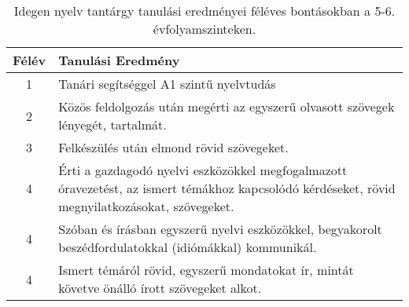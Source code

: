        
           \begin{longtable}{c | p{} }
            \caption[Idegen nyelv 5-6.]{Idegen nyelv tantárgy tanulási eredményei féléves bontásokban a 5-6. évfolyamszinteken. }  \\

            \textbf{Félév} & \textbf{Tanulási Eredmény} \\
            \hline
            \endhead
                                
                                          1 &  Tanári segítséggel A1 szintű nyelvtudás \\ \hline
                                          2 &  Közös feldolgozás után megérti az egyszerű olvasott szövegek lényegét, tartalmát. \\ \hline
                                          3 &  Felkészülés után elmond rövid szövegeket. \\ \hline
                                        
                                          4 &  Érti a gazdagodó nyelvi eszközökkel megfogalmazott óravezetést, az ismert témákhoz kapcsolódó kérdéseket, rövid megnyilatkozásokat, szövegeket. \\ \hline
                                          4 &  Szóban és írásban egyszerű nyelvi eszközökkel, begyakorolt beszédfordulatokkal (idiómákkal) kommunikál. \\ \hline
                                        
                                          4 &  Ismert témáról rövid, egyszerű mondatokat ír, mintát követve önálló írott szövegeket alkot. \\ \hline
                                      
                        \end{longtable}
            \clearpage

